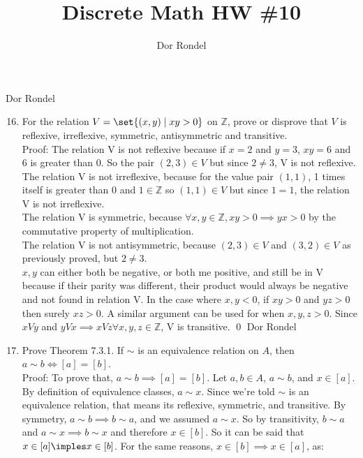 \documentclass{article}
\title{Discrete Math HW \#10}
\author{Dor Rondel}
\begin{document}
\maketitle
\newpage
Dor Rondel \\
\begin{enumerate}
  \setcounter{enumi}{15}
  \item For the relation $V=\set{(x,y) \mid xy>0}$ on $\mathbb{Z}$, prove or disprove that $V$ is reflexive, irreflexive, symmetric, antisymmetric and transitive. \\
\newline
Proof: The relation V is not reflexive because if $x = 2$ and $y = 3$, $xy=6$ and $6$ is greater than 0. So the pair $(2,3) \in V$ but since $2 \neq 3$, V is not reflexive. \\
\newline
The relation V is not irreflexive, because for the value pair $(1,1)$, 1 times itself is greater than 0 and $1 \in \mathbb{Z}$ so $(1,1) \in V$ but since $1=1$, the relation V is not irreflexive. \\
\newline
The relation V is symmetric, because $\forall x,y \in \mathbb{Z}, xy > 0 \implies yx > 0$ by the commutative property of multiplication. \\
\newline
The relation V is not antisymmetric, because $(2,3) \in V$ and $(3,2) \in V$ as previously proved, but $2 \neq 3$. \\
\newline
$x,y$ can either both be negative, or both me positive, and still be in V because if their parity was different, their product would always be negative and not found in relation V. In the case where $x,y < 0$, if $xy > 0$ and $yz > 0$ then surely $xz > 0$. A similar argument can be used for when $x,y,z > 0$. Since $xVy$ and $yVx \implies xVz \forall x,y,z \in \mathbb{Z}$, V is transitive. \qed
\newpage
Dor Rondel \\
  \item Prove Theorem 7.3.1. If $\sim$ is an equivalence relation on $A$, then $a \sim b \iff [a] = [b]$. \\
  \newline
  Proof: To prove that, $a \sim b \implies [a] = [b]$. Let $a,b \in A$, $a \sim b$, and $x \in [a]$. By definition of equivalence classes, $a \sim x$. Since we're told $\sim$ is an equivalence relation, that means its reflexive, symmetric, and transitive. By symmetry, $a \sim b \implies b \sim a$, and we assumed $a \sim x$. So by transitivity, $b \sim a$ and $a \sim x \implies b \sim x$ and therefore $x \in [b]$. So it can be said that $x \in [a] \imples x \in [b]$. For the same reasons, $x \in [b] \implies x \in [a]$, as:

\end{enumerate}
\end{document}
